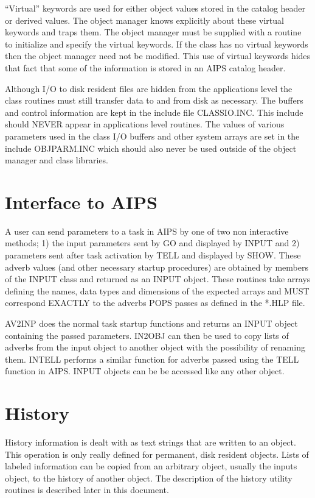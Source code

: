    ``Virtual'' keywords are used for either object values stored in
the catalog header or derived values.  The object manager knows
explicitly about these virtual keywords and traps them.  The object
manager must be supplied with a routine to initialize and specify the
virtual keywords.  If the class has no virtual keywords then the
object manager need not be modified.  This use of virtual keywords
hides that fact that some of the information is stored in an AIPS
catalog header.

   Although I/O to disk resident files are hidden from the
applications level the class routines must still transfer data to and
from disk as necessary.  The buffers and control information are kept
in the include file CLASSIO.INC.  This include should NEVER appear in
applications level routines.  The values of various parameters used in
the class I/O buffers and other system arrays are set in the include
OBJPARM.INC which should also never be used outside of the object
manager and class libraries.

\section{Interface to AIPS}

   A user can send parameters to a task in AIPS by one of two non
interactive methods; 1) the input parameters sent by GO and displayed
by INPUT and 2) parameters sent after task activation by TELL and
displayed by SHOW.  These adverb values (and other necessary startup
procedures) are obtained by members of the INPUT class and returned as
an INPUT object.  These routines take arrays defining the names, data
types and dimensions of the expected arrays and MUST correspond
EXACTLY to the adverbs POPS passes as defined in the *.HLP file.

   AV2INP does the normal task startup functions and returns an INPUT
object containing the passed parameters.  IN2OBJ can then be used to
copy lists of adverbs from the input object to another object with the
possibility of renaming them.  INTELL performs a similar function for
adverbs passed using the TELL function in AIPS.  INPUT objects can be
be accessed like any other object.

\section{History}

   History information is dealt with as text strings that are written
to an object.  This operation is only really defined for permanent,
disk resident objects.  Lists of labeled information can be copied
from an arbitrary object, usually the inputs object, to the history of
another object.  The description of the history utility routines is
described later in this document.


